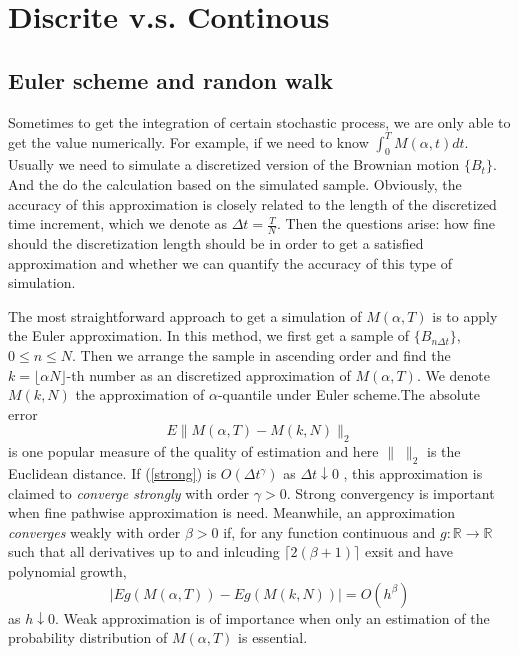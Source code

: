\documentclass[12pt,oneside,titlepage]{book}
\def\bR{{\mathbb{R}}}
\begin{document}
 
\section{Discrite v.s. Continous}
\subsection{Euler scheme and randon walk}

Sometimes to get the integration of certain stochastic process, we are only able to get the value numerically. For example, if we need to know $\int^T_{0} M(\alpha , t)dt$. Usually we need to simulate a discretized version of the Brownian motion $\{B_t\}$. And the do the calculation based on the simulated sample. Obviously,  the accuracy of this approximation is closely related to the length of the discretized time increment, which we denote as $\Delta t= \frac{T}{N}$. Then the questions arise: how fine should the discretization length should be in order to get a satisfied approximation and whether we can quantify the accuracy of this type of simulation. 

The most straightforward approach to get a simulation of $M(\alpha , T)$ is to apply the Euler approximation. In this method, we first get a sample of $\{B_{n \Delta t}\}$, $0\leq n \leq N$. Then we arrange the sample in ascending order and find the $k= \lfloor \alpha  N\rfloor$-th number as an discretized approximation of $M(\alpha , T)$. We denote $M(k, N)$ the approximation of $\alpha$-quantile under Euler scheme.The absolute error 
\begin{equation}\label{strong}
E\|M(\alpha, T)-M(k,N)\|_2
\end{equation}
is one popular measure of the quality of estimation and here $\|\;\| _2$ is the Euclidean distance. If (\ref{strong}) is $O(\Delta t^\gamma)$ as $\Delta t \downarrow 0$ , this approximation is claimed to {\it converge strongly} with order $\gamma > 0 $. Strong convergency is important when fine pathwise approximation is need. Meanwhile, an approximation {\it converges} weakly with order $\beta > 0 $ if, for any function continuous and $g: \bR \to \bR$ such that all derivatives up to and inlcuding $\lceil 2(\beta + 1) \rceil$ exsit and have polynomial growth, 
\begin{equation}
|Eg(M(\alpha,T)) - Eg(M(k, N))| = O (h^\beta) 
\end{equation}
as $h \downarrow 0$. Weak approximation is of importance when only an estimation of the probability distribution of $M(\alpha, T)$ is essential. 
\end{document}
